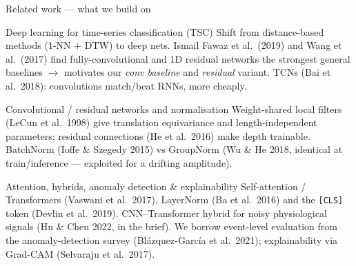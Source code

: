 \documentclass[11pt, aspectratio=169]{beamer}
\begin{document}
\begin{frame}{Related work --- what we build on}
  \footnotesize
  \begin{block}{Deep learning for time-series classification (TSC)}
    Shift from distance-based methods (1-NN $+$ DTW) to deep nets. Ismail Fawaz
    et al.\ (2019) and Wang et al.\ (2017) find fully-convolutional and 1D
    residual networks the strongest general baselines $\rightarrow$ motivates our
    \emph{conv baseline} and \emph{residual} variant. TCNs (Bai et al.\ 2018):
    convolutions match/beat RNNs, more cheaply.
  \end{block}
  \begin{block}{Convolutional / residual networks and normalisation}
    Weight-shared local filters (LeCun et al.\ 1998) give translation
    equivariance and length-independent parameters; residual connections (He et
    al.\ 2016) make depth trainable. BatchNorm (Ioffe \& Szegedy 2015) vs
    GroupNorm (Wu \& He 2018, identical at train/inference --- exploited for a
    drifting amplitude).
  \end{block}
  \begin{block}{Attention, hybrids, anomaly detection \& explainability}
    Self-attention / Transformers (Vaswani et al.\ 2017), LayerNorm (Ba et al.\
    2016) and the \texttt{[CLS]} token (Devlin et al.\ 2019). CNN--Transformer
    hybrid for noisy physiological signals (Hu \& Chen 2022, in the brief). We
    borrow event-level evaluation from the anomaly-detection survey
    (Bl\'azquez-Garc\'ia et al.\ 2021); explainability via Grad-CAM (Selvaraju
    et al.\ 2017).
  \end{block}
\end{frame}
\end{document}
